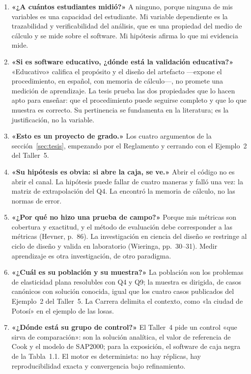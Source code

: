 \documentclass[11pt,a4paper]{article}
\begin{document}
\begin{enumerate}
\item \textbf{«¿A cuántos estudiantes midió?»} A ninguno, porque ninguna de mis variables es una capacidad del estudiante. Mi variable dependiente es la trazabilidad y verificabilidad del análisis, que es una propiedad del medio de cálculo y se mide sobre el software. Mi hipótesis afirma lo que mi evidencia mide.
\item \textbf{«Si es software educativo, ¿dónde está la validación educativa?»} «Educativo» califica el propósito y el diseño del artefacto —expone el procedimiento, en español, con memoria de cálculo—, no promete una medición de aprendizaje. La tesis prueba las dos propiedades que lo hacen apto para enseñar: que el procedimiento puede seguirse completo y que lo que muestra es correcto. Su pertinencia se fundamenta en la literatura; es la justificación, no la variable.
\item \textbf{«Esto es un proyecto de grado.»} Los cuatro argumentos de la sección~\ref{sec:tesis}, empezando por el Reglamento y cerrando con el Ejemplo~2 del Taller~5.
\item \textbf{«Su hipótesis es obvia: si abre la caja, se ve.»} Abrir el código no es abrir el canal. La hipótesis puede fallar de cuatro maneras y falló una vez: la matriz de extrapolación del Q4. La encontró la memoria de cálculo, no las normas de error.
\item \textbf{«¿Por qué no hizo una prueba de campo?»} Porque mis métricas son cobertura y exactitud, y el método de evaluación debe corresponder a las métricas (Hevner, p.~86). La investigación en ciencia del diseño se restringe al ciclo de diseño y valida en laboratorio (Wieringa, pp.~30--31). Medir aprendizaje es otra investigación, de otro paradigma.
\item \textbf{«¿Cuál es su población y su muestra?»} La población son los problemas de elasticidad plana resolubles con Q4 y Q9; la muestra es dirigida, de casos canónicos con solución conocida, igual que los cuatro casos publicados del Ejemplo~2 del Taller~5. La Carrera delimita el contexto, como «la ciudad de Potosí» en el ejemplo de las losas.
\item \textbf{«¿Dónde está su grupo de control?»} El Taller~4 pide un control «que sirva de comparación»: son la solución analítica, el valor de referencia de Cook y el modelo de SAP2000; para la exposición, el software de caja negra de la Tabla~1.1. El motor es determinista: no hay réplicas, hay reproducibilidad exacta y convergencia bajo refinamiento.

\end{enumerate}
\end{document}
